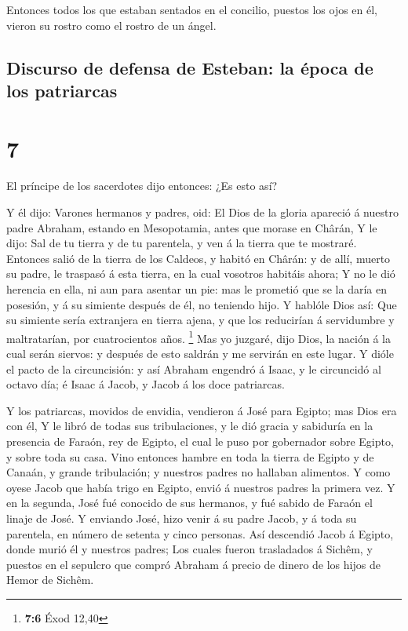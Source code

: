  Entonces todos los que estaban sentados en el concilio,
puestos los ojos en él, vieron su rostro como el rostro de un ángel.

\hypertarget{discurso-de-defensa-de-esteban-la-uxe9poca-de-los-patriarcas}{%
\subsection{Discurso de defensa de Esteban: la época de los
patriarcas}\label{discurso-de-defensa-de-esteban-la-uxe9poca-de-los-patriarcas}}

\hypertarget{section-6}{%
\section{7}\label{section-6}}

 El príncipe de los sacerdotes dijo entonces: ¿Es esto así?

 Y él dijo: Varones hermanos y padres, oid: El Dios de la
gloria apareció á nuestro padre Abraham, estando en Mesopotamia, antes
que morase en Chârán,  Y le dijo: Sal de tu tierra y de tu
parentela, y ven á la tierra que te mostraré.  Entonces
salió de la tierra de los Caldeos, y habitó en Chârán: y de allí, muerto
su padre, le traspasó á esta tierra, en la cual vosotros habitáis ahora;
 Y no le dió herencia en ella, ni aun para asentar un pie:
mas le prometió que se la daría en posesión, y á su simiente después de
él, no teniendo hijo.  Y hablóle Dios así: Que su simiente
sería extranjera en tierra ajena, y que los reducirían á servidumbre y
maltratarían, por cuatrocientos años. \footnote{\textbf{7:6} Éxod 12,40}
 Mas yo juzgaré, dijo Dios, la nación á la cual serán
siervos: y después de esto saldrán y me servirán en este lugar.
 Y dióle el pacto de la circuncisión: y así Abraham engendró
á Isaac, y le circuncidó al octavo día; é Isaac á Jacob, y Jacob á los
doce patriarcas.

 Y los patriarcas, movidos de envidia, vendieron á José para
Egipto; mas Dios era con él,  Y le libró de todas sus
tribulaciones, y le dió gracia y sabiduría en la presencia de Faraón,
rey de Egipto, el cual le puso por gobernador sobre Egipto, y sobre toda
su casa.  Vino entonces hambre en toda la tierra de Egipto
y de Canaán, y grande tribulación; y nuestros padres no hallaban
alimentos.  Y como oyese Jacob que había trigo en Egipto,
envió á nuestros padres la primera vez.  Y en la segunda,
José fué conocido de sus hermanos, y fué sabido de Faraón el linaje de
José.  Y enviando José, hizo venir á su padre Jacob, y á
toda su parentela, en número de setenta y cinco personas. 
Así descendió Jacob á Egipto, donde murió él y nuestros padres;
 Los cuales fueron trasladados á Sichêm, y puestos en el
sepulcro que compró Abraham á precio de dinero de los hijos de Hemor de
Sichêm.

